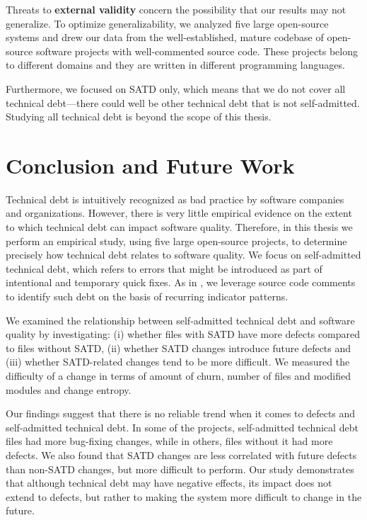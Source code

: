 Threats  to {\bf external validity} concern the possibility that our results may not generalize. To optimize generalizability, we analyzed five large open-source systems and drew our data from the well-established, mature codebase of open-source software projects with well-commented source code. These projects belong to different domains and they are written in different programming languages.


Furthermore, we focused on SATD only, which means that we do not cover all technical debt---there could well be other technical debt that is not self-admitted. Studying all technical debt is beyond the scope of this thesis.





\section{Conclusion and Future Work}
\label{chap3:sec:conclusion}



Technical debt is intuitively recognized as bad practice by software companies and organizations. However, there is very little empirical evidence on the extent to which technical debt can impact software quality. Therefore, in this thesis we perform an empirical study, using five large open-source projects, to determine precisely how technical debt relates to software quality. We focus on self-admitted technical debt, which refers to  errors that might be introduced as part of intentional and temporary quick fixes. As in  \cite{ICSM_PotdarS14}, we leverage source code comments to identify such debt on the basis of recurring indicator patterns.


We examined the relationship between self-admitted technical debt and software quality by investigating: (i) whether files with SATD have more defects compared to files without SATD, (ii) whether SATD changes introduce future defects and (iii) whether SATD-related changes tend to be more difficult. We measured the difficulty of a change in terms of amount of churn, number of files and modified modules and change entropy.




Our findings suggest that there is no reliable trend when it comes to defects and self-admitted technical debt. In some of the projects, self-admitted technical debt files had more bug-fixing changes, while in others, files without it had more defects. We also found that SATD changes are less correlated with future defects than non-SATD changes, but more difficult to perform. 
  Our study demonstrates that although technical debt may have negative effects, its impact does not extend to defects, but rather to making the system more difficult to change in the future.

